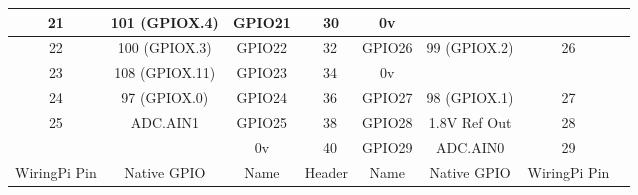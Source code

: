 \documentclass[11pt,a4paper]{article}
\begin{document}
\begin{sffamily}
\begin{center}
\begin{tabular}{|c|c|c||p{8mm}|p{8mm}||c|c|c|c|}
\hline
21	& 101 (GPIOX.4)		& \textcolor{rtb-green}{GPIO21}	& \raggedleft{29} & 30 & \textcolor{rtb-black}{0v}		&					& \\
\hline
22	& 100 (GPIOX.3)		& \textcolor{rtb-green}{GPIO22}	& \raggedleft{31} & 32 & \textcolor{rtb-green}{GPIO26}	& 99 (GPIOX.2)		& 26\\
\hline
23	& 108 (GPIOX.11)	& \textcolor{rtb-green}{GPIO23}	& \raggedleft{33} & 34 & \textcolor{rtb-black}{0v}		&					& \\
\hline
24	& 97 (GPIOX.0)		& \textcolor{rtb-green}{GPIO24}	& \raggedleft{35} & 36 & \textcolor{rtb-green}{GPIO27}	& 98 (GPIOX.1)		& 27\\
\hline
25	& ADC.AIN1			& \textcolor{rtb-green}{GPIO25}	& \raggedleft{37} & 38 & \textcolor{rtb-green}{GPIO28}	& 1.8V Ref Out		& 28\\
\hline
	& 					& \textcolor{rtb-black}{0v}		& \raggedleft{39} & 40 & \textcolor{rtb-green}{GPIO29}	& ADC.AIN0			& 29\\
\hline
\hline
WiringPi Pin	& Native GPIO	& Name	& \multicolumn{2}{|c||}{Header}	& Name	& Native GPIO	& WiringPi Pin\\
\hline
\end{tabular}
\end{center}

\end{sffamily}
\end{document}
